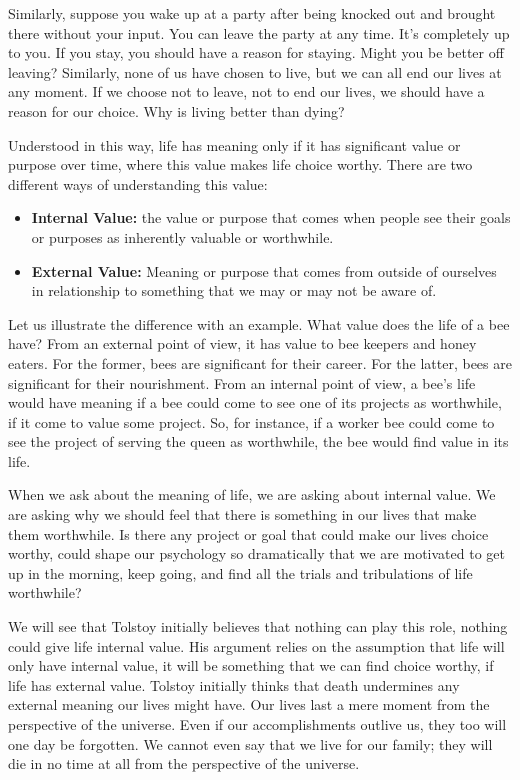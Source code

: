 \documentclass[]{article}
\begin{document}
Similarly, suppose you wake up at a party after being knocked out and
brought there without your input. You can leave the party at any time.
It's completely up to you. If you stay, you should have a reason for
staying. Might you be better off leaving? Similarly, none of us have
chosen to live, but we can all end our lives at any moment. If we choose
not to leave, not to end our lives, we should have a reason for our
choice. Why is living better than dying?

Understood in this way, life has meaning only if it has significant
value or purpose over time, where this value makes life choice worthy.
There are two different ways of understanding this value:

\begin{itemize}
\item
  \textbf{Internal Value:} the value or purpose that comes when people
  see their goals or purposes as inherently valuable or worthwhile.
\item
  \textbf{External Value:} Meaning or purpose that comes from outside of
  ourselves in relationship to something that we may or may not be aware
  of.
\end{itemize}

Let us illustrate the difference with an example. What value does the
life of a bee have? From an external point of view, it has value to bee
keepers and honey eaters. For the former, bees are significant for their
career. For the latter, bees are significant for their nourishment. From
an internal point of view, a bee's life would have meaning if a bee
could come to see one of its projects as worthwhile, if it come to value
some project. So, for instance, if a worker bee could come to see the
project of serving the queen as worthwhile, the bee would find value in
its life.

When we ask about the meaning of life, we are asking about internal
value. We are asking why we should feel that there is something in our
lives that make them worthwhile. Is there any project or goal that could
make our lives choice worthy, could shape our psychology so dramatically
that we are motivated to get up in the morning, keep going, and find all
the trials and tribulations of life worthwhile?

We will see that Tolstoy initially believes that nothing can play this
role, nothing could give life internal value. His argument relies on the
assumption that life will only have internal value, it will be something
that we can find choice worthy, if life has external value. Tolstoy
initially thinks that death undermines any external meaning our lives
might have. Our lives last a mere moment from the perspective of the
universe. Even if our accomplishments outlive us, they too will one day
be forgotten. We cannot even say that we live for our family; they will
die in no time at all from the perspective of the universe.
\end{document}
